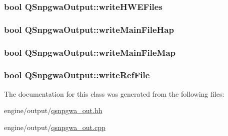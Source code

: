 \label{classQSnpgwaOutput_a623e09a643beb7b19ffe68037571bb2f}
\hypertarget{classQSnpgwaOutput_aa3fe3500366b73d73c6ede530c2962c3}{
\subsubsection[{writeHWEFiles}]{\setlength{\rightskip}{0pt plus 5cm}bool {\bf QSnpgwaOutput::writeHWEFiles}}}
\label{classQSnpgwaOutput_aa3fe3500366b73d73c6ede530c2962c3}
\hypertarget{classQSnpgwaOutput_a289ac8eef9d3d51610541bfbec316c7c}{
\subsubsection[{writeMainFileHap}]{\setlength{\rightskip}{0pt plus 5cm}bool {\bf QSnpgwaOutput::writeMainFileHap}}}
\label{classQSnpgwaOutput_a289ac8eef9d3d51610541bfbec316c7c}
\hypertarget{classQSnpgwaOutput_a4962e53bdd5892a0737e5f91c6cb1099}{
\subsubsection[{writeMainFileMap}]{\setlength{\rightskip}{0pt plus 5cm}bool {\bf QSnpgwaOutput::writeMainFileMap}}}
\label{classQSnpgwaOutput_a4962e53bdd5892a0737e5f91c6cb1099}
\hypertarget{classQSnpgwaOutput_a17d5eb6f91e4e3c88c8215c194a47130}{
\subsubsection[{writeRefFile}]{\setlength{\rightskip}{0pt plus 5cm}bool {\bf QSnpgwaOutput::writeRefFile}}}
\label{classQSnpgwaOutput_a17d5eb6f91e4e3c88c8215c194a47130}


The documentation for this class was generated from the following files:\begin{DoxyCompactItemize}
\item 
engine/output/\hyperlink{qsnpgwa__out_8hh}{qsnpgwa\_\-out.hh}\item 
engine/output/\hyperlink{qsnpgwa__out_8cpp}{qsnpgwa\_\-out.cpp}\end{DoxyCompactItemize}
